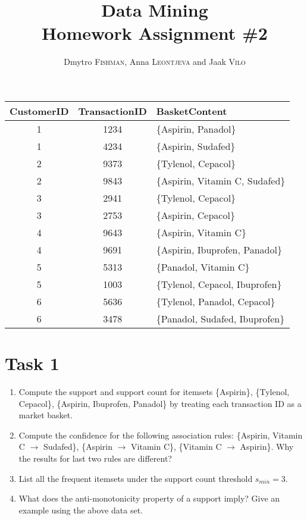 \documentclass{article}
\title{Data Mining\\Homework Assignment \#2} %
\author{Dmytro \textsc{Fishman}, Anna \textsc{Leontjeva} and Jaak \textsc{Vilo}} %
\begin{document}
\maketitle %
\begin{center}
    \begin{tabular}{| c | c | l|}
    \hline
    CustomerID & TransactionID& BasketContent \\ \hline
    	1 & 1234 & \{Aspirin, Panadol\}\\ \hline
    	1 & 4234 & \{Aspirin, Sudafed\}\\ \hline
    	2 & 9373& \{Tylenol, Cepacol\}\\ \hline
	2 & 9843& \{Aspirin, Vitamin C, Sudafed\}\\ \hline 
	3 & 2941& \{Tylenol, Cepacol\}\\ \hline  
	3 & 2753& \{Aspirin, Cepacol\}\\ \hline
	4 & 9643& \{Aspirin, Vitamin C\}\\ \hline
	4 & 9691& \{Aspirin, Ibuprofen, Panadol\}\\ \hline
	5 & 5313& \{Panadol, Vitamin C\}\\ \hline
	5 & 1003& \{Tylenol, Cepacol, Ibuprofen\}\\ \hline
	6 & 5636& \{Tylenol, Panadol, Cepacol\}\\ \hline
	6 & 3478& \{Panadol, Sudafed, Ibuprofen\}\\ \hline
 \end{tabular}
\end{center}
\section*{Task 1}
\begin{enumerate}
\item Compute the support and support count for itemsets \{Aspirin\}, \{Tylenol, Cepacol\}, \{Aspirin, Ibuprofen, Panadol\} by treating each transaction ID as a market basket.
\item Compute the confidence for the following association rules: \{Aspirin, Vitamin C $\rightarrow$ Sudafed\}, \{Aspirin $\rightarrow$ Vitamin C\}, \{Vitamin C $\rightarrow$ Aspirin\}. Why the results for last two rules are different?
\item List all the frequent itemsets under the support count threshold $s_{min} = 3$.
\item What does the anti-monotonicity property of a support imply? Give an example using the above data set. 
\end{enumerate}
\end{document}

